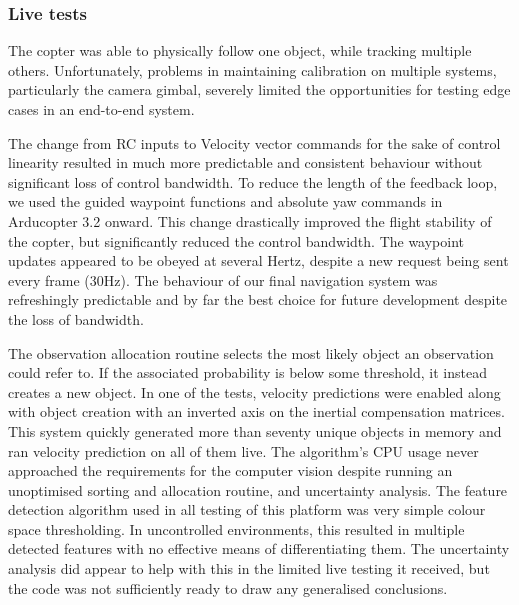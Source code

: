 \documentclass{article}
\newcounter{subsubsubsection}[subsubsection]
\begin{document}
    \subsubsection{Live tests}
      The copter was able to physically follow one object, while tracking multiple others.  Unfortunately, problems in maintaining calibration on multiple systems, particularly the camera gimbal, severely limited the opportunities for testing edge cases in an end-to-end system.

        The change from RC inputs to Velocity vector commands for the sake of control linearity resulted in much more predictable and consistent behaviour without significant loss of control bandwidth.
        To reduce the length of the feedback loop, we used the guided waypoint functions and absolute yaw commands in Arducopter 3.2 onward.  This change drastically improved the flight stability of the copter, but significantly reduced the control bandwidth.  The waypoint updates appeared to be obeyed at several Hertz, despite a new request being sent every frame (30Hz).
        The behaviour of our final navigation system was refreshingly predictable and by far the best choice for future development despite the loss of bandwidth.
      
        The observation allocation routine selects the most likely object an observation could refer to. If the associated probability is below some threshold, it instead creates a new object.
        In one of the tests, velocity predictions were enabled along with object creation with an inverted axis on the inertial compensation matrices. This system quickly generated more than seventy unique objects in memory and ran velocity prediction on all of them live. The algorithm's CPU usage never approached the requirements for the computer vision despite running an unoptimised sorting and allocation routine, and uncertainty analysis.
        The feature detection algorithm used in all testing of this platform was very simple colour space thresholding.  In uncontrolled environments, this resulted in multiple detected features with no effective means of differentiating them.  The uncertainty analysis did appear to help with this in the limited live testing it received, but the code was not sufficiently ready to draw any generalised conclusions.
\end{document}
